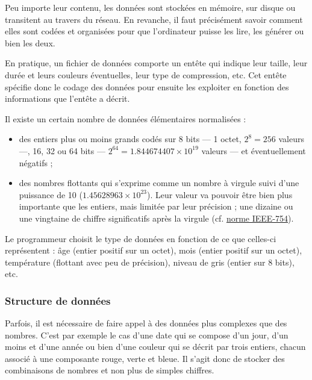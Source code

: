 Peu importe leur contenu, les données sont stockées en mémoire, sur disque ou transitent au travers du réseau. En revanche, il faut précisément savoir comment elles sont codées et organisées pour que l'ordinateur puisse les lire, les générer ou bien les deux.

En pratique, un fichier de données comporte un entête qui indique leur taille, leur durée et leurs couleurs éventuelles, leur type de compression, etc. Cet entête spécifie donc le codage des données pour ensuite les exploiter en fonction des informations que l'entête a décrit.

Il existe un certain nombre de données élémentaires normalisées : 
\begin{itemize}
	\item des entiers plus ou moins grands codés sur 8 bits --- 1 octet, $2^8 = 256$ valeurs ---, 16, 32 ou 64 bits --- $2^{64} = \num{1.844674407}×10^{19}$ valeurs --- et éventuellement négatifs ;
	\item des nombres flottants qui s'exprime comme un nombre à virgule suivi d'une puissance de 10 ($\num{1.45628963} \times 10^{23}$). Leur valeur va pouvoir être bien plus importante que les entiers, mais limitée par leur précision ; une dizaine ou une vingtaine de chiffre significatifs après la virgule (cf. \href{https://fr.wikipedia.org/wiki/IEEE_754}{norme IEEE-754}).
\end{itemize}

Le programmeur choisit le type de données en fonction de ce que celles-ci représentent : âge (entier positif sur un octet), mois (entier positif sur un octet), température (flottant avec peu de précision), niveau de gris (entier sur 8 bits), etc.

\subsubsection[Structure de données]{Structure de données}
\label{subsub:V.3.2.2}

Parfois, il est nécessaire de faire appel à des données plus complexes que des nombres. C'est par exemple le cas d'une date qui se compose d'un jour, d'un moins et d'une année ou bien d'une couleur qui se décrit par trois entiers, chacun associé à une composante rouge, verte et bleue. Il s'agit donc de stocker des combinaisons de nombres et non plus de simples chiffres.

